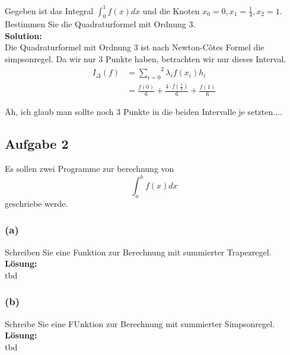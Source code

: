 \documentclass[11pt,a4paper,ngerman]{article}
\begin{document}
Gegeben ist das Integral $\int_0^1 f(x) dx$ und die Knoten $x_0 = 0, x_1 = \frac{1}{4}, x_2 = 1$.
Bestimmen Sie die Quadraturformel mit Ordnung 3.\\

\textbf{Solution:}\\

Die Quadraturformel mit Ordnung 3 ist nach Newton-Côtes Formel die simpsonregel. Da wir nur 3 Punkte haben, betrachten wir
nur dieses Interval.\\

\begin{equation*}\begin{split}
    I_\Delta (f) &= \overset{2}{\underset{i=0}{\sum}} \lambda_{i} f(x_i) h_{i}\\
    &= \frac{f(0)}{6} + \frac{4 \cdot f(\frac{1}{4})}{6} + \frac{f(1)}{6}
\end{split}\end{equation*}

Äh, ich glaub man sollte noch 3 Punkte in die beiden Intervalle je setzten....
\subsection*{Aufgabe 2}

Es sollen zwei Programme zur berechnung von
$$
    \int_a^b f(x) dx
$$
geschriebe werde.

\subsubsection*{(a)}

Schreiben Sie eine Funktion zur Berechnung mit summierter Trapezregel.\\

\textbf{Lösung:}\\

tbd

\subsubsection*{(b)}

Schreibe Sie eine FUnktion zur Berechnung mit summierter Simpsonregel.\\

\textbf{Lösung:}\\

tbd
\end{document}
